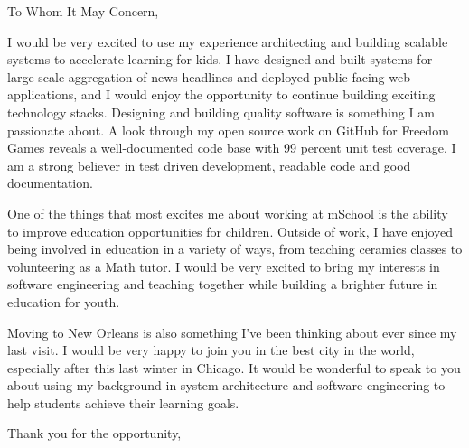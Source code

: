 
\signature{Walter Askew\\
1220 N Washtenaw Apt 3R\\
Chicago, IL 60622}

\begin{letter}{}

\opening{To Whom It May Concern,}

I would be very excited to use my experience architecting and building
scalable systems to accelerate learning for kids.
I have designed and built systems for large-scale aggregation of news
headlines and deployed public-facing web applications, and I would
enjoy the opportunity to continue building exciting technology
stacks.
Designing and building quality software is something I am passionate
about.
A look through my open source work on GitHub for Freedom Games reveals
a well-documented code base with 99 percent unit test coverage.
I am a strong believer in test driven development, readable code and
good documentation.

One of the things that most excites me about working at mSchool is the
ability to improve education opportunities for children.
Outside of work, I have enjoyed being involved in education in a
variety of ways,
from teaching ceramics classes to volunteering as a Math tutor.
I would be very excited to bring my interests in software engineering
and teaching together while building a brighter future in education
for youth.

Moving to New Orleans is also something I've been thinking about
ever since my last visit.
I would be very happy to join you in the best city in the world,
especially after this last winter in Chicago.
It would be wonderful to speak to you about using my background in
system architecture and software engineering to help students achieve
their learning goals.

\closing{Thank you for the opportunity,}
\end{letter}

